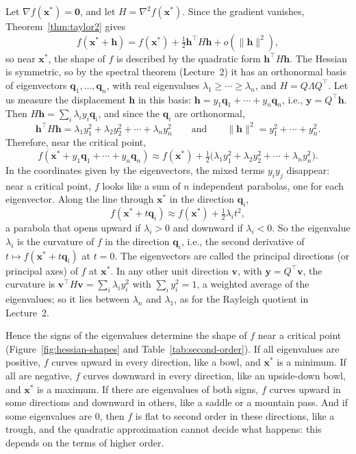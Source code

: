 \documentclass[11pt]{article}
\newcommand{\norm}[1]{\lVert #1 \rVert}
\theoremstyle{definition}
\theoremstyle{plain}
\theoremstyle{remark}
\begin{document}
Let $\nabla f(\mathbf{x}^*) = \mathbf{0}$, and let $H = \nabla^2 f(\mathbf{x}^*)$. Since the gradient vanishes, Theorem~\ref{thm:taylor2} gives
\[f(\mathbf{x}^* + \mathbf{h}) = f(\mathbf{x}^*) + \tfrac{1}{2}\mathbf{h}^\top H\mathbf{h} + o(\norm{\mathbf{h}}^2),\]
so near $\mathbf{x}^*$, the shape of $f$ is described by the quadratic form $\mathbf{h}^\top H\mathbf{h}$. The Hessian is symmetric, so by the spectral theorem (Lecture~2) it has an orthonormal basis of eigenvectors $\mathbf{q}_1, \ldots, \mathbf{q}_n$, with real eigenvalues $\lambda_1 \geq \cdots \geq \lambda_n$, and $H = Q\Lambda Q^\top$. Let us measure the displacement $\mathbf{h}$ in this basis: $\mathbf{h} = y_1\mathbf{q}_1 + \cdots + y_n\mathbf{q}_n$, i.e., $\mathbf{y} = Q^\top\mathbf{h}$. Then $H\mathbf{h} = \sum_i \lambda_i y_i\mathbf{q}_i$, and since the $\mathbf{q}_i$ are orthonormal,
\[\mathbf{h}^\top H\mathbf{h} = \lambda_1 y_1^2 + \lambda_2 y_2^2 + \cdots + \lambda_n y_n^2 \qquad \text{and} \qquad \norm{\mathbf{h}}^2 = y_1^2 + \cdots + y_n^2.\]
Therefore, near the critical point,
\[f(\mathbf{x}^* + y_1\mathbf{q}_1 + \cdots + y_n\mathbf{q}_n) \approx f(\mathbf{x}^*) + \tfrac{1}{2}\big(\lambda_1 y_1^2 + \lambda_2 y_2^2 + \cdots + \lambda_n y_n^2\big).\]
In the coordinates given by the eigenvectors, the mixed terms $y_i y_j$ disappear: near a critical point, $f$ looks like a sum of $n$ independent parabolas, one for each eigenvector. Along the line through $\mathbf{x}^*$ in the direction $\mathbf{q}_i$,
\[f(\mathbf{x}^* + t\mathbf{q}_i) \approx f(\mathbf{x}^*) + \tfrac{1}{2}\lambda_i t^2,\]
a parabola that opens upward if $\lambda_i > 0$ and downward if $\lambda_i < 0$. So the eigenvalue $\lambda_i$ is the curvature of $f$ in the direction $\mathbf{q}_i$, i.e., the second derivative of $t \mapsto f(\mathbf{x}^* + t\mathbf{q}_i)$ at $t = 0$. The eigenvectors are called the principal directions (or principal axes) of $f$ at $\mathbf{x}^*$. In any other unit direction $\mathbf{v}$, with $\mathbf{y} = Q^\top\mathbf{v}$, the curvature is $\mathbf{v}^\top H\mathbf{v} = \sum_i \lambda_i y_i^2$ with $\sum_i y_i^2 = 1$, a weighted average of the eigenvalues; so it lies between $\lambda_n$ and $\lambda_1$, as for the Rayleigh quotient in Lecture~2.

Hence the signs of the eigenvalues determine the shape of $f$ near a critical point (Figure~\ref{fig:hessian-shapes} and Table~\ref{tab:second-order}). If all eigenvalues are positive, $f$ curves upward in every direction, like a bowl, and $\mathbf{x}^*$ is a minimum. If all are negative, $f$ curves downward in every direction, like an upside-down bowl, and $\mathbf{x}^*$ is a maximum. If there are eigenvalues of both signs, $f$ curves upward in some directions and downward in others, like a saddle or a mountain pass. And if some eigenvalues are $0$, then $f$ is flat to second order in these directions, like a trough, and the quadratic approximation cannot decide what happens: this depends on the terms of higher order.
\end{document}
